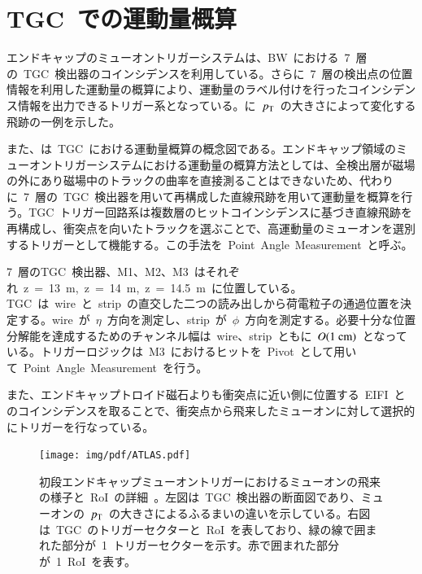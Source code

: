 \section{TGC~での運動量概算}
エンドキャップのミューオントリガーシステムは、BW~における~7~層の~TGC~検出器のコインシデンスを利用している。さらに~7~層の検出点の位置情報を利用した運動量の概算により、運動量のラベル付けを行ったコインシデンス情報を出力できるトリガー系となっている。に~$p_{\rm{T}}$~の大きさによって変化する飛跡の一例を示した。

また、は~TGC~における運動量概算の概念図である。エンドキャップ領域のミューオントリガーシステムにおける運動量の概算方法としては、全検出層が磁場の外にあり磁場中のトラックの曲率を直接測ることはできないため、代わりに~7~層の~TGC~検出器を用いて再構成した直線飛跡を用いて運動量を概算を行う。TGC~トリガー回路系は複数層のヒットコインシデンスに基づき直線飛跡を再構成し、衝突点を向いたトラックを選ぶことで、高運動量のミューオンを選別するトリガーとして機能する。この手法を~Point~Angle~Measurement~と呼ぶ。

7~層のTGC~検出器、M1、M2、M3~はそれぞれ~z~=~13~m,~z~=~14~m,~z~=~14.5~m~に位置している。TGC~は~wire~と~strip~の直交した二つの読み出しから荷電粒子の通過位置を決定する。wire~が~$\eta$~方向を測定し、strip~が~$\phi$~方向を測定する。必要十分な位置分解能を達成するためのチャンネル幅は~wire、strip~ともに~$O(1~\rm{cm})$~となっている。トリガーロジックは~M3~におけるヒットを~Pivot~として用いて~Point~Angle~Measurement~を行う。

また、エンドキャップトロイド磁石よりも衝突点に近い側に位置する~EIFI~とのコインシデンスを取ることで、衝突点から飛来したミューオンに対して選択的にトリガーを行なっている。

\begin{figure}[H]
        \centering   
        \texttt{[image: img/pdf/ATLAS.pdf]}
        \caption[初段エンドキャップミューオントリガーにおけるミューオンの飛来の様子と~RoI~の詳細]{初段エンドキャップミューオントリガーにおけるミューオンの飛来の様子と~RoI~の詳細~\cite{TR:01}。左図は~TGC~検出器の断面図であり、ミューオンの~$p_{\rm{T}}$~の大きさによるふるまいの違いを示している。右図は~TGC~のトリガーセクターと~RoI~を表しており、緑の線で囲まれた部分が~1~トリガーセクターを示す。赤で囲まれた部分が~1~RoI~を表す。}
        \label{fig:tgcpt}
\end{figure}

